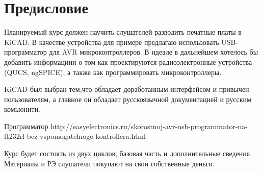 \section{Предисловие}\label{kicad:introduction:pre}
Планируемый курс должен научить слушателей разводить печатные платы в KiCAD. В качестве устройства для примере предлагаю использовать USB-программатор для AVR микроконтроллеров. В идеале в дальнейшем хотелось бы добавить информациии о том как проектируются радиоэлектронные устройства (QUCS, ngSPICE), а также как программировать микроконтроллеры.

KiCAD был выбран тем,что обладает доработанным интерфейсом и привычен пользователям, а главное он обладает русскоязычной документацией и русским комьюнити.

Программатор http://easyelectronics.ru/skorostnoj-avr-usb-programmator-na-ft232rl-bez-vspomogatelnogo-kontrollera.html

Курс будет состоять из двух циклов, базовая часть и дополнительные сведения. Материалы и РЭ слушатели покупают на свои собственные деньги. 
